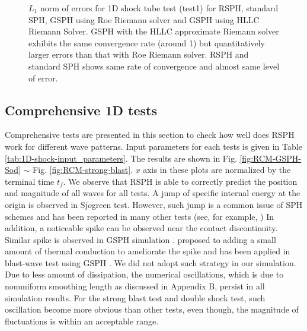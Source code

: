 \documentclass[review]{elsarticle}
\begin{document}
\begin{figure}[H]
\begin{minipage}{.39\textwidth}
    \end{minipage}%
    \caption{ $L_1$ norm of errors for 1D shock tube test (test1) for RSPH, standard SPH, GSPH using Roe Riemann solver and GSPH using HLLC Riemann Solver. GSPH with the HLLC approximate Riemann solver exhibits the same convergence rate (around 1) but quantitatively larger errors than that with Roe Riemann solver. RSPH and standard SPH shows same rate of convergence and almost same level of error.}
    \label{fig:Accuracy-test1}
\end{figure}
 
\subsection{Comprehensive 1D tests} \label{sec:comprehensive-1d-tests}
Comprehensive tests are presented in this section to check how well does RSPH work for different wave patterns. Input parameters for each tests is given in Table \ref{tab:1D-shock-input_parameters}.
The results are shown in Fig. \ref{fig:RCM-GSPH-Sod} $\sim$ Fig. \ref{fig:RCM-strong-blast}. $x$ axis in these plots are normalized by the terminal time $t_f$. 
We observe that RSPH is able to correctly predict the position and magnitude of all waves for all tests. A jump of specific internal energy at the origin is observed in Sj$\ddot{o}$green test. However, such jump is a common issue of SPH schemes and has been reported in many other tests (see, for example, \citep{monaghan1997sph,cha2003implementations,puri2014approximate})
In addition, a noticeable spike can be observed near the contact discontinuity. Similar spike is observed in GSPH simulation \citep{puri2014comparison}.
\citet{noh1987errors} proposed to adding a small amount of thermal conduction to ameliorate the spike and has been applied in blast-wave test using GSPH \citep{puri2014comparison}. We did not adopt such strategy in our simulation.
Due to less amount of dissipation, the numerical oscillations, which is due to nonuniform smoothing length as discussed in Appendix B, persist in all simulation results. For the strong blast test and double shock test, such oscillation become more obvious than other tests, even though, the magnitude of fluctuations is within an acceptable range.
\end{document}

